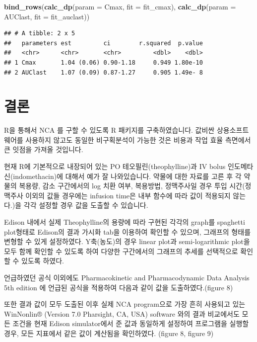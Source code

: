 \documentclass[
  10pt,
]{krantz}
\makeatletter
\newenvironment{Shaded}{\begin{snugshade}}{\end{snugshade}}
\newcommand{\DataTypeTok}[1]{\textcolor[rgb]{0.13,0.29,0.53}{#1}}
\newcommand{\KeywordTok}[1]{\textcolor[rgb]{0.13,0.29,0.53}{\textbf{#1}}}
\newcommand{\NormalTok}[1]{#1}
\newcommand{\StringTok}[1]{\textcolor[rgb]{0.31,0.60,0.02}{#1}}
\newenvironment{kframe}{%
\medskip{}
\setlength{\fboxsep}{.8em}
 \def\at@end@of@kframe{}%
 \ifinner\ifhmode%
  \def\at@end@of@kframe{\end{minipage}}%
  \begin{minipage}{\columnwidth}%
 \fi\fi%
 \def\FrameCommand##1{\hskip\@totalleftmargin \hskip-\fboxsep
 \colorbox{shadecolor}{##1}\hskip-\fboxsep
     \hskip-\linewidth \hskip-\@totalleftmargin \hskip\columnwidth}%
 \MakeFramed {\advance\hsize-\width
   \@totalleftmargin\z@ \linewidth\hsize
   \@setminipage}}%
 {\par\unskip\endMakeFramed%
 \at@end@of@kframe}
\renewenvironment{Shaded}{\begin{kframe}}{\end{kframe}}
\makeatother
\begin{document}
\begin{Shaded}
\begin{Highlighting}[]
\KeywordTok{bind\_rows}\NormalTok{(}\KeywordTok{calc\_dp}\NormalTok{(}\DataTypeTok{param =} \StringTok{\textquotesingle{}Cmax\textquotesingle{}}\NormalTok{, }\DataTypeTok{fit =}\NormalTok{ fit\_cmax),}
          \KeywordTok{calc\_dp}\NormalTok{(}\DataTypeTok{param =} \StringTok{\textquotesingle{}AUClast\textquotesingle{}}\NormalTok{, }\DataTypeTok{fit =}\NormalTok{ fit\_auclast))}
\end{Highlighting}
\end{Shaded}

\begin{verbatim}
## # A tibble: 2 x 5
##   parameters est         ci        r.squared  p.value
##   <chr>      <chr>       <chr>         <dbl>    <dbl>
## 1 Cmax       1.04 (0.06) 0.90-1.18     0.949 1.80e-10
## 2 AUClast    1.07 (0.09) 0.87-1.27     0.905 1.49e- 8
\end{verbatim}

\hypertarget{conclusion}{%
\chapter{결론}\label{conclusion}}

R을 통해서 NCA 를 구할 수 있도록 R 패키지를 구축하였습니다. 값비싼 상용소프트웨어를 사용하지 않고도 동일한 비구획분석이 가능한 것은 비용과 작업 효율 측면에서 큰 잇점을 가져올 것입니다.

현재 R에 기본적으로 내장되어 있는 PO 테오필린(theophylline)과 IV bolus 인도메타신(indomethacin)에 대해서 예가 잘 나와있습니다.
약물에 대한 자료를 고른 후 각 약물의 복용량, 감소 구간에서의 log 치환 여부, 복용방법, 정맥주사일 경우 투입 시간(정맥주사 이외의 값들 경우에는 infusion time은 내부 함수에 따라 값이 적용되지 않는다.)을 각각 설정할 경우 값을 도출할 수 있습니다.

Edison 내에서 실제 Theophylline의 용량에 따라 구현된 각각의 graph를 spaghetti plot형태로 Edison의 결과 가시화 tab을 이용하여 확인할 수 있으며, 그래프의 형태를 변형할 수 있게 설정하였다.
Y축(농도)의 경우 linear plot과 semi-logarithmic plot을 모두 함께 확인할 수 있도록 하여 다양한 구간에서의 그래프의 추세를 선택적으로 확인할 수 있도록 하였다.

언급하였던 공식 이외에도 Pharmacokinetic and Pharmacodynamic Data Analysis 5th edition 에 언급된 공식을 적용하여 다음과 같이 값을 도출하였다.(figure 8)

또한 결과 값이 모두 도출된 이후 실제 NCA program으로 가장 흔히 사용되고 있는 WinNonlin® (Version 7.0 Pharsight, CA, USA) software 와의 결과 비교에서도 모든 조건을 현재 Edison simulator에서 준 값과 동일하게 설정하여 프로그램을 실행할 경우, 모든 지표에서 같은 값이 계산됨을 확인하였다. (figure 8, figure 9)
\end{document}
